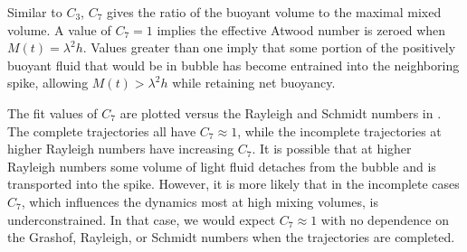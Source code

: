 Similar to $C_3$, $C_7$ gives the ratio of the buoyant volume to the maximal mixed volume.
A value of $C_7 = 1$ implies the effective Atwood number is zeroed when $M(t) = \lambda^2 h$.
Values greater than one imply that some portion of the positively buoyant fluid that would be in bubble has become entrained into the neighboring spike, allowing $M(t) > \lambda^2 h$ while retaining net buoyancy.

The fit values of $C_7$ are plotted versus the Rayleigh and Schmidt numbers in .
The complete trajectories all have $C_7 \approx 1$, while the incomplete trajectories at higher Rayleigh numbers have increasing $C_7$.
It is possible that at higher Rayleigh numbers some volume of light fluid detaches from the bubble and is transported into the spike.
However, it is more likely that in the incomplete cases $C_7$, which influences the dynamics most at high mixing volumes, is underconstrained.
In that case, we would expect $C_7 \approx 1$ with no dependence on the Grashof, Rayleigh, or Schmidt numbers when the trajectories are completed.

